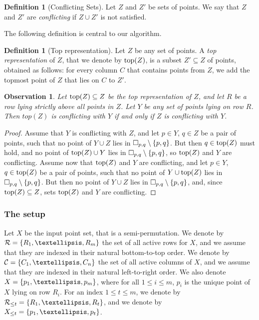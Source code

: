 \documentclass[11pt]{article}
\numberwithin{equation}{section}
\theoremstyle{definition}
\newtheorem{definition}[theorem]{Definition}
\theoremstyle{plain}
\newtheorem{myobs}[theorem]{Observation}
\begin{document}
\begin{definition}[Conflicting Sets]  
Let $Z$ and $Z'$ be sets of points. 
We say that $Z$ and $Z'$ are \emph{conflicting} if $Z \cup Z'$ is not satisfied. 
%
\end{definition} 



%
%

%
%
%
%
%


The following definition is central to our algorithm.

\begin{definition}[Top representation]  
Let $Z$ be any set of points.
A \emph{top representation} of $Z$, that we denote by $\operatorname{top}(Z)$, is a subset $Z' \subseteq Z$ of points, obtained as follows: for every column $C$ that contains points from $Z$, we add the topmost point of $Z$ that lies on $C$ to $Z'$.
\end{definition} 

\begin{myobs} 
\label{obs:top points sufficient} 
Let $\operatorname{top}(Z) \subseteq Z$ be the top representation of $Z$, and let $R$ be a row lying strictly above all points in $Z$. Let $Y$ be any set of points lying on row $R$. Then $top(Z)$ is conflicting with $Y$ if and only if $Z$ is conflicting with $Y$.  
\end{myobs} 
\begin{proof}
	Assume that $Y$ is conflicting with $Z$, and let $p\in Y$, $q\in Z$ be a pair of points, such that no point of $Y\cup Z$ lies in $\Box_{p,q}\setminus\left\{ p,q \right\}$. But then $q\in \operatorname{top}(Z)$ must hold, and no point of $\operatorname{top}(Z)\cup Y$ lies in $\Box_{p,q}\setminus\left\{ p,q \right\}$, so $\operatorname{top}(Z)$ and $Y$ are conflicting.
	Assume now that $\operatorname{top}(Z)$ and $Y$ are conflicting, and let $p\in Y$, $q\in \operatorname{top}(Z)$ be a pair of points, such that no point of $Y\cup \operatorname{top}(Z)$ lies in $\Box_{p,q}\setminus\left\{ p,q \right\}$. But then no point of $Y\cup Z$ lies in $\Box_{p,q}\setminus\left\{ p,q \right\}$, and, since $\operatorname{top}(Z)\subseteq Z$, sets $\operatorname{top}(Z)$ and $Y$ are conflicting.
\end{proof}




%



\subsubsection{The setup} 

Let $X$ be the input point set, that is a semi-permutation.
We denote by $\rset=\set{R_1,\ldots,R_m}$ the set of all active rows for $X$, and we assume that they are indexed in their natural bottom-to-top order. We denote by $\cset=\set{C_1,\ldots,C_n}$ the set of all active columns of $X$, and we assume that they are indexed in their natural left-to-right order. We also denote $X=\set{p_1,\ldots,p_m}$, where for all $1\leq i\leq m$, $p_i$ is the unique point of $X$ lying on row $R_i$.
For an index $1\leq t\leq m$, we denote by $\rset_{\leq t}=\set{R_1,\ldots,R_t}$, and we denote by $X_{\leq t}=\set{p_1,\ldots,p_t}$.
\end{document}
